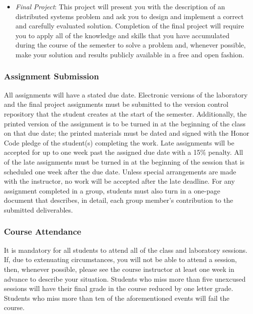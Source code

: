 \begin{itemize}
    \item {\em Final Project}: This project will present you with the description of an distributed systems problem and
      ask you to design and implement a correct and carefully evaluated solution. Completion of the final project will
      require you to apply all of the knowledge and skills that you have accumulated during the course of the semester
      to solve a problem and, whenever possible, make your solution and results publicly available in a free and open
      fashion.

\end{itemize}

\subsubsection*{Assignment Submission}

All assignments will have a stated due date. Electronic versions of the laboratory and the final project assignments
must be submitted to the version control repository that the student creates at the start of the semester.
Additionally, the printed version of the assignment is to be turned in at the beginning of the class on that due date;
the printed materials must be dated and signed with the Honor Code pledge of the student(s) completing the work.  Late
assignments will be accepted for up to one week past the assigned due date with a 15\% penalty. All of the late
assignments must be turned in at the beginning of the session that is scheduled one week after the due date. Unless
special arrangements are made with the instructor, no work will be accepted after the late deadline. For any assignment
completed in a group, students must also turn in a one-page document that describes, in detail, each group member's
contribution to the submitted deliverables.

\subsubsection*{Course Attendance}

It is mandatory for all students to attend all of the class and laboratory sessions. If, due to extenuating
circumstances, you will not be able to attend a session, then, whenever possible, please see the course instructor at
least one week in advance to describe your situation.  Students who miss more than five unexcused sessions will have
their final grade in the course reduced by one letter grade. Students who miss more than ten of the aforementioned
events will fail the course.

